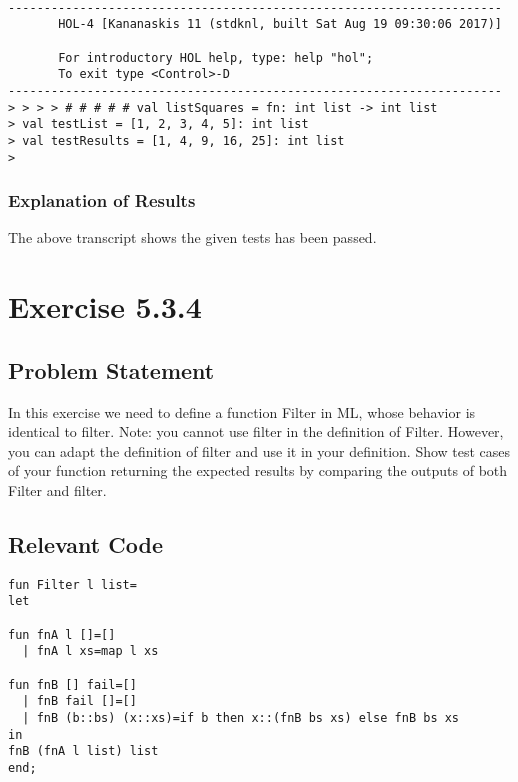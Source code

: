 \documentclass{report}
\begin{document}
\setcounter{sessioncount}{0}
\begin{session}
  \begin{scriptsize}
\begin{verbatim}

---------------------------------------------------------------------
       HOL-4 [Kananaskis 11 (stdknl, built Sat Aug 19 09:30:06 2017)]

       For introductory HOL help, type: help "hol";
       To exit type <Control>-D
---------------------------------------------------------------------
> > > > # # # # # val listSquares = fn: int list -> int list
> val testList = [1, 2, 3, 4, 5]: int list
> val testResults = [1, 4, 9, 16, 25]: int list
> 
\end{verbatim}
  \end{scriptsize}
\end{session}

\subsection{Explanation of Results}
\label{sec:explanation-results-2}

The above transcript shows the given tests has been passed.



\chapter{Exercise 5.3.4}
\label{cha:exercise-5.3.4}

\section{Problem Statement}
\label{sec:problem-statement-3}
In this exercise we need to define a function Filter in ML, whose
behavior is identical to filter. Note: you cannot use filter in the
definition of Filter. However, you can adapt the definition of filter
and use it in your definition.  Show test cases of your function
returning the expected results by comparing the outputs of both Filter
and filter.

\section{Relevant Code}
\label{sec:relevant-code-3}


\lstset{frameround=tttt}
\begin{lstlisting}[frame=tRBL]
fun Filter l list=
let

fun fnA l []=[]
  | fnA l xs=map l xs

fun fnB [] fail=[]
  | fnB fail []=[]
  | fnB (b::bs) (x::xs)=if b then x::(fnB bs xs) else fnB bs xs
in
fnB (fnA l list) list
end;

\end{lstlisting}
\end{document}
